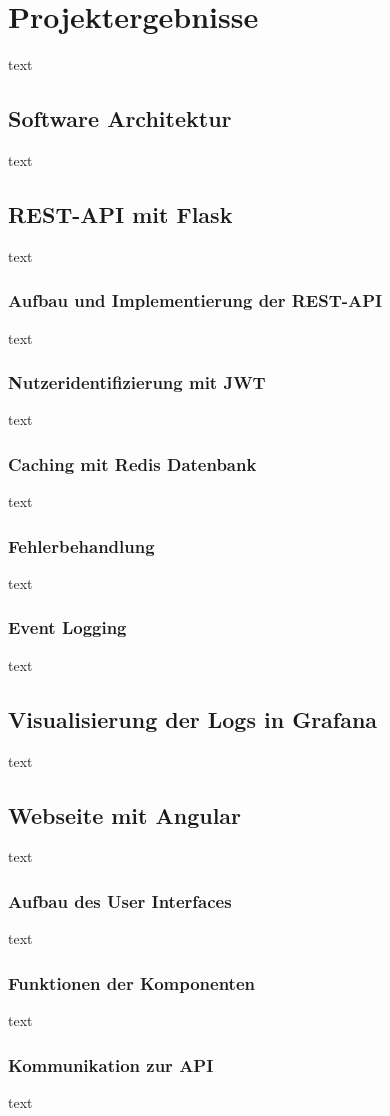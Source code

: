 \section{Projektergebnisse}
text
\subsection{Software Architektur}
text
\subsection{REST-API mit Flask}
text
\subsubsection{Aufbau und Implementierung der REST-API}
text
\subsubsection{Nutzeridentifizierung mit JWT}
text
\subsubsection{Caching mit Redis Datenbank}
text
\subsubsection{Fehlerbehandlung}
text
\subsubsection{Event Logging}
text
\subsection{Visualisierung der Logs in Grafana}
text
\subsection{Webseite mit Angular}
text
\subsubsection{Aufbau des User Interfaces}
text
\subsubsection{Funktionen der Komponenten}
text
\subsubsection{Kommunikation zur API}
text
